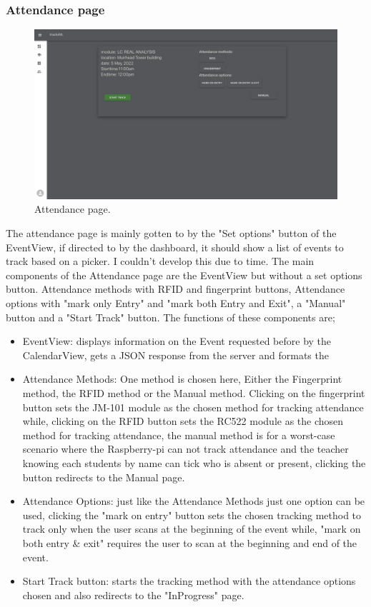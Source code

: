 \subsubsection{Attendance page}
\begin{figure}[ht!]
  \includegraphics[scale=0.135]{Design & Implementation/images/Attendance.png}
  \caption{Attendance page.}
\end{figure}
The attendance page is mainly gotten to by the "Set options" button of the EventView, if directed to by the dashboard, it should show a list of events to track based on a picker. I couldn't develop this due to time. The main components of the Attendance page are the EventView but without a set options button. Attendance methods with RFID and fingerprint buttons, Attendance options with "mark only Entry" and "mark both Entry and Exit", a "Manual" button and a "Start Track" button. The functions of these components are;

\begin{itemize}
  \item EventView: displays information on the Event requested before by the CalendarView, gets a JSON response from the server and formats the 
  \item Attendance Methods: One method is chosen here, Either the Fingerprint method, the RFID method or the Manual method. Clicking on the fingerprint button sets the JM-101 module as the chosen method for tracking attendance while, clicking on the RFID button sets the RC522 module as the chosen method for tracking attendance, the manual method is for a worst-case scenario where the Raspberry-pi can not track attendance and the teacher knowing each students by name can tick who is absent or present, clicking the button redirects to the Manual page. 
  \item Attendance Options: just like the Attendance Methods just one option can be used, clicking the "mark on entry" button sets the chosen tracking method to track only when the user scans at the beginning of the event while, "mark on both entry \& exit" requires the user to scan at the beginning and end of the event.
  \item Start Track button: starts the tracking method with the attendance options chosen and also redirects to the "InProgress" page.  
\end{itemize}

